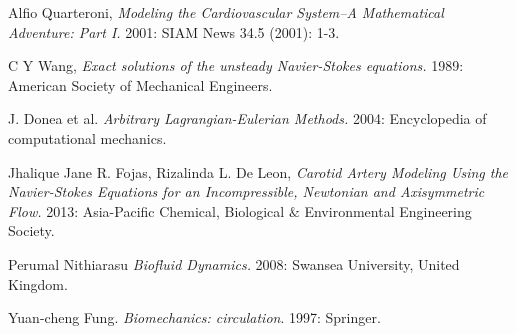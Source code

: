 \documentclass[12pt, a4paper]{article}
\theoremstyle{plain}
\theoremstyle{definition}
\theoremstyle{remark}
\begin{document}
 \begin{thebibliography}{1}
  Alfio Quarteroni, {\em Modeling the Cardiovascular System--A Mathematical Adventure: Part I.} 2001: SIAM News 34.5 (2001): 1-3.

   C Y Wang, {\em Exact solutions of the unsteady Navier-Stokes equations.} 1989: American Society of Mechanical Engineers.

    J. Donea et al. {\em Arbitrary Lagrangian-Eulerian Methods.} 2004: Encyclopedia of computational mechanics.

    Jhalique Jane R. Fojas, Rizalinda L. De Leon, {\em Carotid Artery Modeling Using the Navier-Stokes Equations for an Incompressible, Newtonian and Axisymmetric Flow.} 2013: Asia-Pacific Chemical, Biological $\&$ Environmental Engineering Society.

   Perumal Nithiarasu {\em Biofluid Dynamics.} 2008: Swansea University, United Kingdom.

   Yuan-cheng Fung. {\em Biomechanics: circulation}. 1997: Springer.
  \end{thebibliography}
\end{document}
